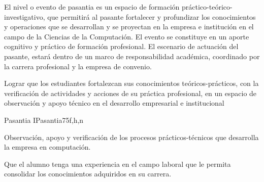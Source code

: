 \begin{syllabus}


\begin{justification}
El nivel o evento de pasantia es un espacio de formación práctico-teórico-investigativo, que permitirá al pasante fortalecer y profundizar los conocimientos y operaciones que se desarrollan y se proyectan en la empresa e institución en el campo de la Ciencias de la Computación. El evento se constituye en un aporte cognitivo y práctico de formación profesional. El escenario de actuación del pasante, estará dentro de un marco de responsabilidad académica, coordinado por la carrera profesional y la empresa de convenio.
\end{justification}

\begin{goals}
\item Lograr que los estudiantes fortalezcan sus conocimientos teóricos-prácticos, con la verificación de actividades y acciones de su práctica profesional, en un espacio de observación y apoyo técnico en el desarrollo empresarial e institucional  
\end{goals}

\begin{outcomes}
\end{outcomes}

\begin{unit}{Pasantia I}{Pasantia}{75}{f,h,n}
   \begin{topics}
      \item Observación, apoyo y verificación de los procesos prácticos-técnicos que desarrolla la empresa en computación.
   \end{topics}
   
   \begin{learningoutcomes}
      \item Que el alumno tenga una experiencia en el campo laboral que le permita consolidar los conocimientos adquiridos en su carrera.
   \end{learningoutcomes}
\end{unit}

\begin{coursebibliography}
\end{coursebibliography}

\end{syllabus}
